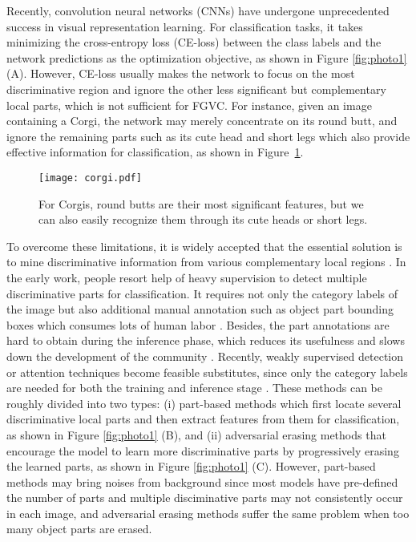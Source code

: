 \documentclass{article}
\begin{document}
Recently, convolution neural networks (CNNs) have undergone unprecedented success in visual representation learning. For classification tasks, it takes minimizing the cross-entropy loss (CE-loss) between the class labels and the network predictions as the optimization objective, as shown in Figure \ref{fig:photo1}(A). However, CE-loss usually makes the network to focus on the most discriminative region \cite{ge2019weakly} and ignore the other less significant but complementary local parts, which is not sufficient for FGVC. For instance, given an image containing a Corgi, the network may merely concentrate on its round butt, and ignore the remaining parts such as its cute head and short legs which also provide effective information for classification, as shown in Figure~\ref{fig:corgi}.

\begin{figure}[!t]
\centering
\texttt{[image: corgi.pdf]}
\caption{For Corgis, round butts are their most significant features, but we can also easily recognize them through its cute heads or short legs.}
\label{fig:corgi}
\end{figure}

To overcome these limitations, it is widely accepted that the essential solution is to mine discriminative information from various complementary local regions \cite{wang2018learning,chen2019destruction}. In the early work, people resort help of heavy supervision to detect multiple discriminative parts for classification. It requires not only the category labels of the image but also additional manual annotation such as object part bounding boxes which consumes lots of human labor \cite{berg2013poof,lei2016fast}. Besides, the 
part annotations are hard to obtain during the inference phase, which reduces its usefulness and slows down the development of the community \cite{zheng2017learning}. Recently, weakly supervised detection or attention techniques become feasible substitutes, since only the category labels are needed for both the training and inference stage \cite{zheng2017learning,yang2018learning,wang2018learning,ma2019fine,du2020fine}. These methods can be roughly divided into two types: (i) part-based methods \cite{zheng2017learning,yang2018learning,wang2018learning,ma2019fine,chen2019destruction} which first locate several discriminative local parts and then extract features from them for classification, as shown in Figure \ref{fig:photo1} (B), and (ii) adversarial erasing methods \cite{DBLP:journals/corr/abs-1708-04552,Choe_2019_CVPR,8237643,Zhang_2018_CVPR} that encourage the model to learn more discriminative parts by progressively erasing the learned parts, as shown in Figure \ref{fig:photo1} (C). However, part-based methods may bring noises from background since most models have pre-defined the number of parts and multiple disciminative parts may not consistently occur in each image, and adversarial erasing methods suffer the same problem when too many object parts are erased.
\end{document}
